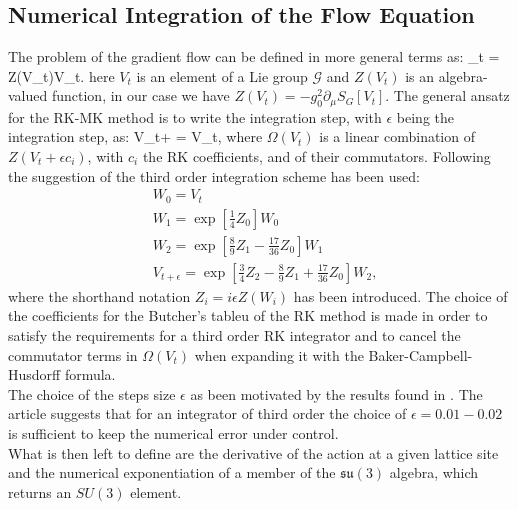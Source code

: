 \subsection{Numerical Integration of the Flow Equation}
The problem of the gradient flow can be defined in more general terms as:
\beq
    _t =  Z(V_t)V_t.
\eeq
here $V_t$ is an element of a Lie group $\mathcal{G}$ and $Z(V_t)$ is an algebra-valued function, in our case we have $Z(V_t) = -g_0^2\partial_\mu S_G[V_t]$. The general ansatz for the RK-MK method is to write the integration step, with $\epsilon$ being the integration step, as:
\beq
    V_{t+\epsilon} =   V_t,
\eeq
where $\Omega(V_t)$ is a linear combination of $Z(V_t + \epsilon c_i)$, with $c_i$ the RK coefficients, and of their commutators. 
Following the suggestion of \cite{luscher_properties_2010} the third order integration scheme  has been used:
\begin{align}
    \label{eq:integrator}
    &W_0 = V_t\\\nonumber
    &W_1 = \exp\left[ \frac{1}{4}Z_0 \right] W_0 \\\nonumber
    &W_2 = \exp\left[ \frac{8}{9}Z_1 - \frac{17}{36}Z_0 \right] W_1\\\nonumber
    &V_{t+\epsilon} = \exp\left[ \frac{3}{4}Z_2 - \frac{8}{9}Z_1 + \frac{17}{36}Z_0\right] W_2,
\end{align}
where the shorthand notation $Z_i = i\epsilon Z(W_i)$ has been introduced. The choice of the coefficients for the Butcher's tableu \cite{_numerical_????} of the RK method is made in order to satisfy the requirements for a third order RK integrator and to cancel the commutator terms in $\Omega(V_t)$ when expanding it with the Baker-Campbell-Husdorff formula. \\
The choice of the steps size $\epsilon$ as been motivated by the results found in \cite{ce_testing_2015}. The article suggests that for an integrator of third order the choice of $\epsilon=0.01-0.02$ is sufficient to keep the numerical error under control.\\
What is then left to define are the derivative of the action at a given lattice site and the numerical exponentiation of a member of the $\mathfrak{su}(3)$ algebra, which returns an $SU(3)$ element.

